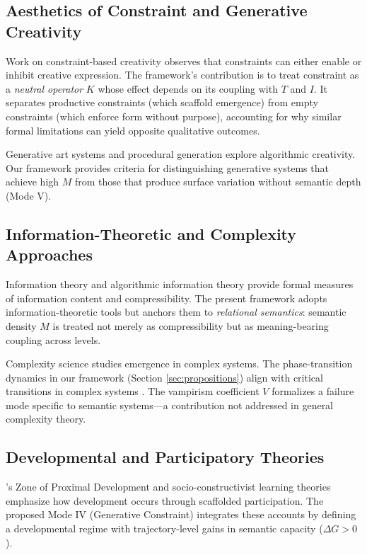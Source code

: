 \documentclass[12pt]{article}
\begin{document}
\subsection{Aesthetics of Constraint and Generative Creativity}

Work on constraint-based creativity \citep{stokes2005creativity, elster2000ulysses} observes that constraints can either enable or inhibit creative expression. The framework's contribution is to treat constraint as a \textit{neutral operator} $K$ whose effect depends on its coupling with $T$ and $I$. It separates productive constraints (which scaffold emergence) from empty constraints (which enforce form without purpose), accounting for why similar formal limitations can yield opposite qualitative outcomes.

Generative art systems \citep{boden2004creative} and procedural generation \citep{shaker2016procedural} explore algorithmic creativity. Our framework provides criteria for distinguishing generative systems that achieve high $M$ from those that produce surface variation without semantic depth (Mode V).

\subsection{Information-Theoretic and Complexity Approaches}

Information theory \citep{shannon1948mathematical} and algorithmic information theory \citep{kolmogorov1965three, solomonoff1964formal} provide formal measures of information content and compressibility. The present framework adopts information-theoretic tools but anchors them to \textit{relational semantics}: semantic density $M$ is treated not merely as compressibility but as meaning-bearing coupling across levels.

Complexity science \citep{mitchell2009complexity} studies emergence in complex systems. The phase-transition dynamics in our framework (Section \ref{sec:propositions}) align with critical transitions in complex systems \citep{scheffer2009critical}. The vampirism coefficient $V$ formalizes a failure mode specific to semantic systems—a contribution not addressed in general complexity theory.

\subsection{Developmental and Participatory Theories}

\citet{vygotsky1978mind}'s Zone of Proximal Development and socio-constructivist learning theories \citep{lave1991situated} emphasize how development occurs through scaffolded participation. The proposed Mode IV (Generative Constraint) integrates these accounts by defining a developmental regime with trajectory-level gains in semantic capacity ($\Delta G > 0$).
\end{document}
